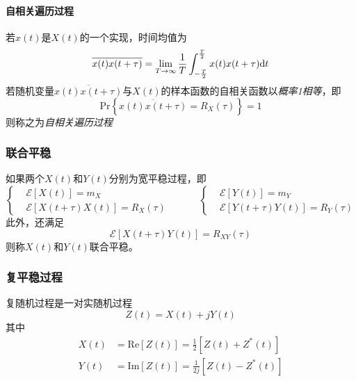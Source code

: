     \paragraph{自相关遍历过程}\mbox{}

    若$x(t)$是$X(t)$的一个实现，时间均值为
    \begin{equation}
        \overline{x(t)x(t+\tau)}=\lim_{T\to\infty}\frac{1}{T}\int_{-\frac{T}{2}}^{\frac{T}{2}}x(t)x(t+\tau)\text{\upshape d} t
    \end{equation}
    若随机变量$\overline{x(t)x(t+\tau)}$与$X(t)$的样本函数的自相关函数以\emph{概率1相等}，即
    \begin{equation}
        \text{Pr}\left\{\overline{x(t)x(t+\tau)}=R_X(\tau) \right\}=1
    \end{equation}
    则称之为\emph{自相关遍历过程}

    \subsubsection{联合平稳}
    如果两个$X(t)$和$Y(t)$分别为宽平稳过程，即
    \begin{equation*}
        \left\{\begin{aligned}
            &\mathscr{E}[X(t)]=m_X\\
            &\mathscr{E}[X(t+\tau)X(t)]=R_X(\tau)
        \end{aligned}\right.
        \hspace{3em}
        \left\{\begin{aligned}
            &\mathscr{E}[Y(t)]=m_Y\\
            &\mathscr{E}[Y(t+\tau)Y(t)]=R_Y(\tau)
        \end{aligned}\right.
    \end{equation*}
    此外，还满足
    \begin{equation}
        \mathscr{E}[X(t+\tau)Y(t)]=R_{XY}(\tau)
    \end{equation}
    则称$X(t)$和$Y(t)$联合平稳。

    \subsubsection{复平稳过程}
    复随机过程是一对实随机过程
    \begin{equation}
        Z(t)=X(t)+jY(t)
    \end{equation}
    其中
    \begin{align}
        X(t)&=\text{Re}[Z(t)]=\frac{1}{2}[Z(t)+Z^*(t)]\\
        Y(t)&=\text{Im}[Z(t)]=\frac{1}{2j}[Z(t)-Z^*(t)]
    \end{align}

